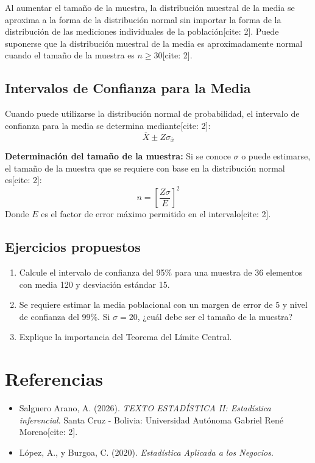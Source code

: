\documentclass[12pt,a4paper]{book}
\begin{document}
\begin{definicion}
Al aumentar el tamaño de la muestra, la distribución muestral de la media se aproxima a la forma de la distribución normal sin importar la forma de la distribución de las mediciones individuales de la población[cite: 2]. Puede suponerse que la distribución muestral de la media es aproximadamente normal cuando el tamaño de la muestra es $n \ge 30$[cite: 2].
\end{definicion}

\section{Intervalos de Confianza para la Media}
Cuando puede utilizarse la distribución normal de probabilidad, el intervalo de confianza para la media se determina mediante[cite: 2]:
\[
\overline{X} \pm Z \sigma_{\overline{x}}
\]

\textbf{Determinación del tamaño de la muestra:} Si se conoce $\sigma$ o puede estimarse, el tamaño de la muestra que se requiere con base en la distribución normal es[cite: 2]:
\[
n = \left[ \frac{Z \sigma}{E} \right]^2
\]
Donde $E$ es el factor de error máximo permitido en el intervalo[cite: 2].

\section{Ejercicios propuestos}
\begin{enumerate}
    \item Calcule el intervalo de confianza del 95\% para una muestra de 36 elementos con media 120 y desviación estándar 15.
    \item Se requiere estimar la media poblacional con un margen de error de 5 y nivel de confianza del 99\%. Si $\sigma = 20$, ¿cuál debe ser el tamaño de la muestra?
    \item Explique la importancia del Teorema del Límite Central.
\end{enumerate}

\backmatter

\chapter{Referencias}
\begin{itemize}
    \item Salguero Arano, A. (2026). \textit{TEXTO ESTADÍSTICA II: Estadística inferencial}. Santa Cruz - Bolivia: Universidad Autónoma Gabriel René Moreno[cite: 2].
    \item López, A., y Burgoa, C. (2020). \textit{Estadística Aplicada a los Negocios}.
\end{itemize}
\end{document}
